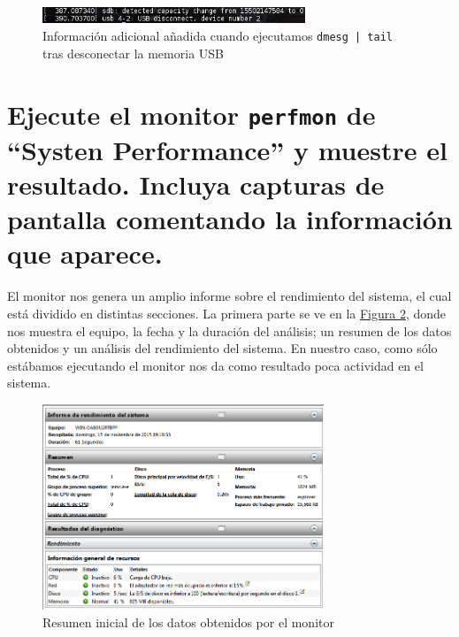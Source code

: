 \documentclass[10pt,a4paper,spanish]{article}
\numberwithin{equation}{section} %
\numberwithin{figure}{section} %
\numberwithin{table}{section} %
\begin{document}
\begin{figure}[!h]
    \centering
    \includegraphics[width=0.7\textwidth]{9}
    \caption{Información adicional añadida cuando ejecutamos \texttt{dmesg | tail} tras desconectar la memoria USB}
    \label{dmesg3}
\end{figure}

\section{Ejecute el monitor \texttt{perfmon} de ``Systen Performance'' y muestre el resultado. Incluya capturas de pantalla comentando la información que aparece.}
El monitor nos genera un amplio informe sobre el rendimiento del sistema, el cual está dividido en distintas secciones. La primera parte se ve en la \hyperref[perfmon1]{Figura \ref*{perfmon1}}, donde nos muestra el equipo, la fecha y la duración del análisis; un resumen de los datos obtenidos y un análisis del rendimiento del sistema. En nuestro caso, como sólo estábamos ejecutando el monitor nos da como resultado poca actividad en el sistema.

\begin{figure}[!h]
    \centering
    \includegraphics[width=0.75\textwidth]{10}
    \caption{Resumen inicial de los datos obtenidos por el monitor}
    \label{perfmon1}
\end{figure}
\end{document}
